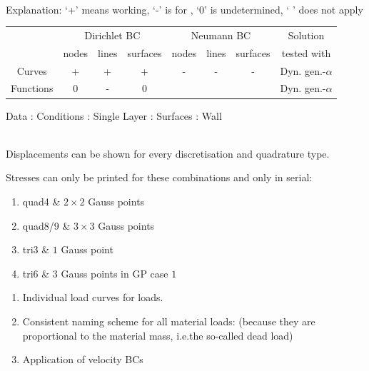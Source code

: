 \\
Explanation: `+' means working, `-' is for , `0' is undetermined, ` ' does not apply
\begin{center}
\begin{tabular}{c|ccc|ccc|c}
  & \multicolumn{3}{c|}{Dirichlet BC} & \multicolumn{3}{c|}{Neumann BC}
  & Solution
\\
  & nodes & lines & surfaces & nodes & lines & surfaces & tested with
\\ \hline
  Curves & + & + & + & - & - & - & Dyn. gen.-$\alpha$
\\
  Functions & 0 & - & 0 &  &  & & Dyn. gen.-$\alpha$
\end{tabular}
\end{center}


 Data : Conditions : Single Layer : Surfaces : Wall

\\
Displacements can be shown for every discretisation and quadrature type.

Stresses can only be printed for these combinations and only in serial:
\begin{enumerate}
\item quad4 \& $2\times2$ Gauss points
\item quad8/9 \& $3\times3$ Gauss points
\item tri3 \& $1$ Gauss point
\item tri6 \& $3$ Gauss points in GP case $1$
\end{enumerate}

\begin{enumerate}
\item Individual load curves for loads.
\item Consistent naming scheme for all material loads:  (because they
  are proportional to the material mass, i.e.\@ the so-called dead load)
\item Application of velocity BCs
\end{enumerate}


